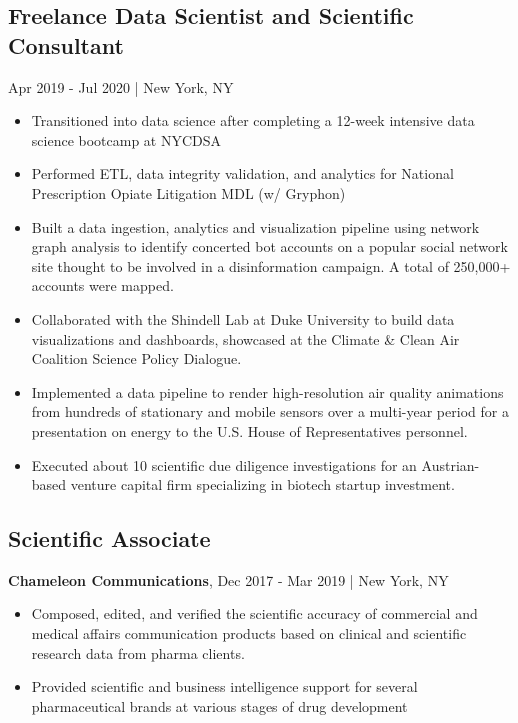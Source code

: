 \documentclass[11pt]{article}
\newenvironment{myitemize}
{ \begin{itemize}
	\setlength{\itemsep}{0pt}
	\setlength{\parskip}{0pt}
	\setlength{\parsep}{0pt}     }
{ \end{itemize}                  }
\begin{document}
\subsection*{Freelance Data Scientist and Scientific Consultant} Apr 2019 - Jul 2020 | New York, NY
\begin{myitemize}
	\item Transitioned into data science after completing a 12-week intensive data science bootcamp at NYCDSA 
	\item Performed ETL, data integrity validation, and analytics for National Prescription Opiate Litigation MDL (w/ Gryphon)
	\item Built a data ingestion, analytics and visualization pipeline using network graph analysis to identify concerted bot accounts on a popular social network site thought to be involved in a disinformation campaign. A total of 250,000+ accounts were mapped.
	\item Collaborated with the Shindell Lab at Duke University to build data visualizations and dashboards, showcased at the Climate \& Clean Air Coalition Science Policy Dialogue.
	\item Implemented a data pipeline to render high-resolution air quality animations from hundreds of stationary and mobile sensors over a multi-year period for a presentation on energy to the U.S. House of Representatives personnel. 
	\item Executed about 10 scientific due diligence investigations for an Austrian-based venture capital firm specializing in biotech startup investment.
\end{myitemize}

\pagebreak

\subsection*{Scientific Associate}
{\bfseries Chameleon Communications}, Dec 2017 - Mar 2019 | New York, NY
\begin{myitemize}
	\item Composed, edited, and verified the scientific accuracy of commercial and medical affairs communication products based on clinical and scientific research data from pharma clients.
	\item Provided scientific and business intelligence support for several pharmaceutical brands at various stages of drug development
\end{myitemize}
\end{document}
